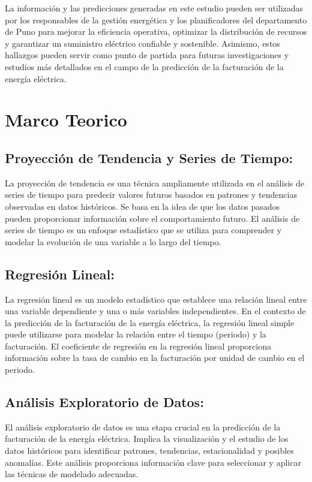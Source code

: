 \documentclass{article}
\begin{document}
La información y las predicciones generadas en este estudio pueden ser utilizadas por los responsables de la gestión energética y los planificadores del departamento de Puno para mejorar la eficiencia operativa, optimizar la distribución de recursos y garantizar un suministro eléctrico confiable y sostenible. Asimismo, estos hallazgos pueden servir como punto de partida para futuras investigaciones y estudios más detallados en el campo de la predicción de la facturación de la energía eléctrica.



\section{Marco Teorico}

\subsection{Proyección de Tendencia y Series de Tiempo:}
La proyección de tendencia es una técnica ampliamente utilizada en el análisis de series de tiempo para predecir valores futuros basados en patrones y tendencias observadas en datos históricos. Se basa en la idea de que los datos pasados pueden proporcionar información sobre el comportamiento futuro. El análisis de series de tiempo es un enfoque estadístico que se utiliza para comprender y modelar la evolución de una variable a lo largo del tiempo.

\subsection{Regresión Lineal:}
La regresión lineal es un modelo estadístico que establece una relación lineal entre una variable dependiente y una o más variables independientes. En el contexto de la predicción de la facturación de la energía eléctrica, la regresión lineal simple puede utilizarse para modelar la relación entre el tiempo (periodo) y la facturación. El coeficiente de regresión en la regresión lineal proporciona información sobre la tasa de cambio en la facturación por unidad de cambio en el periodo.

\subsection{Análisis Exploratorio de Datos:}
El análisis exploratorio de datos es una etapa crucial en la predicción de la facturación de la energía eléctrica. Implica la visualización y el estudio de los datos históricos para identificar patrones, tendencias, estacionalidad y posibles anomalías. Este análisis proporciona información clave para seleccionar y aplicar las técnicas de modelado adecuadas.
\end{document}
